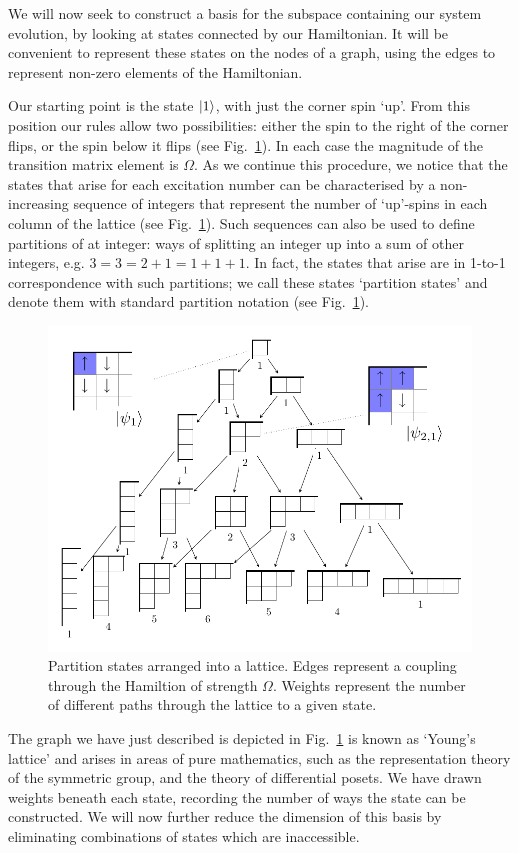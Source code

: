   We will now seek to construct a basis for the subspace containing our system evolution, by looking at states connected by our Hamiltonian. It will be convenient to represent these states on the nodes of a graph, using the edges to represent non-zero elements of the Hamiltonian.

  Our starting point is the state $\left\vert1\right\rangle$, with just the corner spin `up'. From this position our rules allow two possibilities: either the spin to the right of the corner flips, or the spin below it flips (see Fig.~\ref{partition_states}). In each case the magnitude of the transition matrix element is $\Omega$. As we continue this procedure, we notice that the states that arise for each excitation number can be characterised by a non-increasing sequence of integers that represent the number of `up'-spins in each column of the lattice (see Fig.~\ref{partition_states}). Such sequences can also be used to define partitions of at integer: ways of splitting an integer up into a sum of other integers, e.g. $3=3=2+1=1+1+1$. In fact, the states that arise are in 1-to-1 correspondence with such partitions; we call these states `partition states' and denote them with standard partition notation (see Fig.~\ref{partition_states}).
  \begin{figure}
  \includegraphics[scale=0.6]{assets/youngs_lattice_with_spins}
  \caption{Partition states arranged into a lattice. Edges represent a coupling
    through the Hamiltion of strength $\Omega$. Weights represent the
      number of different paths through the lattice to a given state.}
      \label{partition_states}
      \end{figure}
      The graph we have just described is depicted in Fig.~\ref{partition_states}  is known as `Young's lattice' and arises in areas of pure mathematics, such as the representation theory of the symmetric group, and the theory of differential posets. We have drawn weights beneath each state, recording the number of ways the state can be constructed. We will now further reduce the dimension of this basis
      by eliminating combinations of states which are inaccessible.


